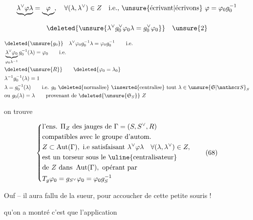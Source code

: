 \[
\underbrace{\lambda^\vee\varphi\lambda}=\underbrace{\varphi},\quad\forall(\lambda,\lambda^\vee)\in Z\quad\text{i.e., \unsure{écrivant|écrivons} }\varphi=\varphi_0g_0^{-1}
\]

\[
\deleted{\unsure{\lambda^\vee g_0^\vee\varphi_0\lambda=g_0^\vee\varphi_0}}\quad\unsure{2}
\]

\[
\begin{aligned}
&\deleted{\unsure{g_0}}\quad\lambda^\vee\varphi_0g_0^{-1}\lambda=\varphi_0g_0^{-1}\qquad\text{i.e.}\\
&\underbrace{\lambda^\vee\varphi_0}_{\varphi_0\lambda^{-1}}g_0^{-1}(\lambda)=\varphi_0\qquad\text{i.e.}\\
&\deleted{\unsure{R}}\qquad\deleted{\varphi_0=\lambda_0}\\
&\lambda^{-1}g_0^{-1}(\lambda)=1\\
&\lambda=g_0^{-1}(\lambda)\qquad\text{i.e. } g_0\ \deleted{\text{normalise}}\ \inserted{\text{centralise}}\ \text{tout }\lambda\in\unsure{\mathfrak S|\mathscr S}_S\\
&\text{ou }g_0(\lambda)=\lambda\qquad\text{provenant de }\deleted{\unsure{\mathfrak S_S}}\ Z
\end{aligned}
\]

 on trouve

\[
\left\{\begin{aligned}
&\text{l'ens. }\Pi_Z\ \text{des jauges de }\Gamma=(S,S^\vee,R)\\
&\text{compatibles avec le groupe d'autom.}\\
&Z\subset\operatorname{Aut}(\Gamma),\ \text{i.e satisfaisant }\lambda^\vee\varphi\lambda\quad\forall(\lambda,\lambda^\vee)\in Z,\\
&\text{est un torseur sous le \uline{centralisateur}}\\
&\text{de }Z\ \text{dans }\operatorname{Aut}(\Gamma),\ \text{opérant par}\\
&T_g\varphi_0=g_{S^\vee}\varphi_0=\varphi_0g_S^{-1}
\end{aligned}\right. \tag*{(68)}
\]



Ouf -- il aura fallu de la sueur, pour accoucher de cette petite souris !

 qu'on a montré c'est que l'application

